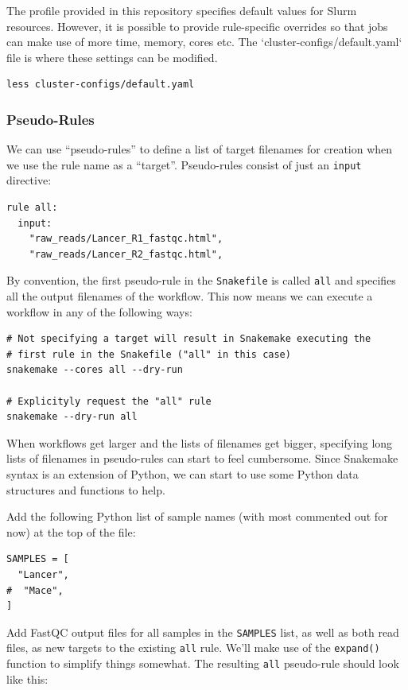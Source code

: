 The profile provided in this repository specifies default values for Slurm resources.
However, it is possible to provide rule-specific overrides so that jobs can make use of more time, memory, cores etc.
The `cluster-configs/default.yaml` file is where these settings can be modified.

\begin{lstlisting}
less cluster-configs/default.yaml
\end{lstlisting}

\subsubsection{Pseudo-Rules}

We can use ``pseudo-rules'' to define a list of target filenames for creation when we use the rule name as a ``target''.
Pseudo-rules consist of just an \texttt{input} directive:

\begin{lstlisting}
rule all:
  input:
    "raw_reads/Lancer_R1_fastqc.html",
    "raw_reads/Lancer_R2_fastqc.html",
\end{lstlisting}

By convention, the first pseudo-rule in the \texttt{Snakefile} is called \texttt{all} and specifies all the output filenames of the workflow.
This now means we can execute a workflow in any of the following ways:

\begin{lstlisting}
# Not specifying a target will result in Snakemake executing the
# first rule in the Snakefile ("all" in this case)
snakemake --cores all --dry-run

# Explicityly request the "all" rule
snakemake --dry-run all
\end{lstlisting}

When workflows get larger and the lists of filenames get bigger, specifying long lists of filenames in pseudo-rules can start to feel cumbersome.
Since Snakemake syntax is an extension of Python, we can start to use some Python data structures and functions to help.

Add the following Python list of sample names (with most commented out for now) at the top of the file:

\begin{lstlisting}
SAMPLES = [
  "Lancer",
#  "Mace",
]
\end{lstlisting}

Add FastQC output files for all samples in the \texttt{SAMPLES} list, as well as both read files, as new targets to the existing \texttt{all} rule.
We'll make use of the \texttt{expand()} function to simplify things somewhat.
The resulting \texttt{all} pseudo-rule should look like this:

